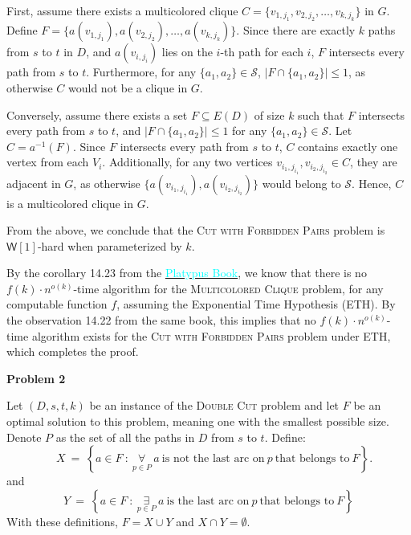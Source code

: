 \documentclass[12pt]{article}
\begin{document}
	First, assume there exists a multicolored clique \(C = \{v_{1, j_{1}},
	v_{2, j_{2}}, \ldots, v_{k, j_{k}}\}\) in \(G\). Define \(F =
	\{a(v_{1, j_{1}}), a(v_{2, j_{2}}), \ldots, a(v_{k, j_{k}})\}\). Since there
	are exactly \(k\) paths from \(s\) to \(t\) in \(D\), and
	\(a(v_{i, j_{i}})\) lies on the \(i\)-th path for each \(i\), \(F\)
	intersects every path from \(s\) to \(t\). Furthermore, for any \(\{a_{1},
	a_{2}\} \in \mathcal{S}\), \(|F \cap \{a_{1}, a_{2}\}| \leqslant 1\), as
	otherwise \(C\) would not be a clique in \(G\).
	
	\medskip
	
	Conversely, assume there exists a set \(F \subseteq E(D)\) of size \(k\)
	such that \(F\) intersects every path from \(s\) to \(t\), and \(|F \cap
	\{a_{1}, a_{2}\}| \leqslant 1\) for any \(\{a_{1}, a_{2}\} \in
	\mathcal{S}\). Let \(C = a^{-1}(F)\). Since \(F\) intersects every path from
	\(s\) to \(t\), \(C\) contains exactly one vertex from each \(V_{i}\).
	Additionally, for any two vertices \(v_{i_{1}, j_{i_{1}}},
	v_{i_{2}, j_{i_{2}}} \in C\), they are adjacent in \(G\), as otherwise
	\(\{a(v_{i_{1}, j_{i_{1}}}), a(v_{i_{2}, j_{i_{2}}})\}\) would belong to
	\(\mathcal{S}\). Hence, \(C\) is a multicolored clique in \(G\).
	
	\medskip
	
	From the above, we conclude that the \textsc{Cut with Forbidden Pairs}
	problem is \(\mathsf{W}[1]\)-hard when parameterized by \(k\).
	
	\medskip
	
	By the corollary 14.23 from the
	\href{https://parameterized-algorithms.mimuw.edu.pl/}
	{\textcolor{cyan}{Platypus Book}}, we know that there is no \(f(k) \cdot
	n^{o(k)}\)-time algorithm for the \textsc{Multicolored Clique} problem, for
	any computable function \(f\), assuming the Exponential Time Hypothesis
	(ETH). By the observation 14.22 from the same book, this implies that no
	\(f(k) \cdot n^{o(k)}\)-time algorithm exists for the \textsc{Cut with
	Forbidden Pairs} problem under ETH, which completes the proof.
	
	\newpage
	
	\textbf{Problem 2}
	
	\medskip
	
	Let \((D, s, t, k)\) be an instance of the \textsc{Double Cut} problem and
	let \(F\) be an optimal solution to this problem, meaning one with the
	smallest possible size. Denote \(P\) as the set of all the paths in \(D\)
	from \(s\) to \(t\). Define:
	\[ \quad X \ = \ \left\{a \in F \ : \ \underset{p \in P}{\forall} \ a \
	\text{is not the last arc on} \ p \ \text{that belongs to} \ F \right\}
	\text{.} \]
	and
	\[ Y \ = \ \left\{a \in F \ : \ \underset{p \in P}{\exists} \ a \
	\text{is the last arc on} \ p \ \text{that belongs to} \ F \right\} \]
	With these definitions, \(F = X \cup Y\) and \(X \cap Y = \emptyset\).
	
\end{document}

